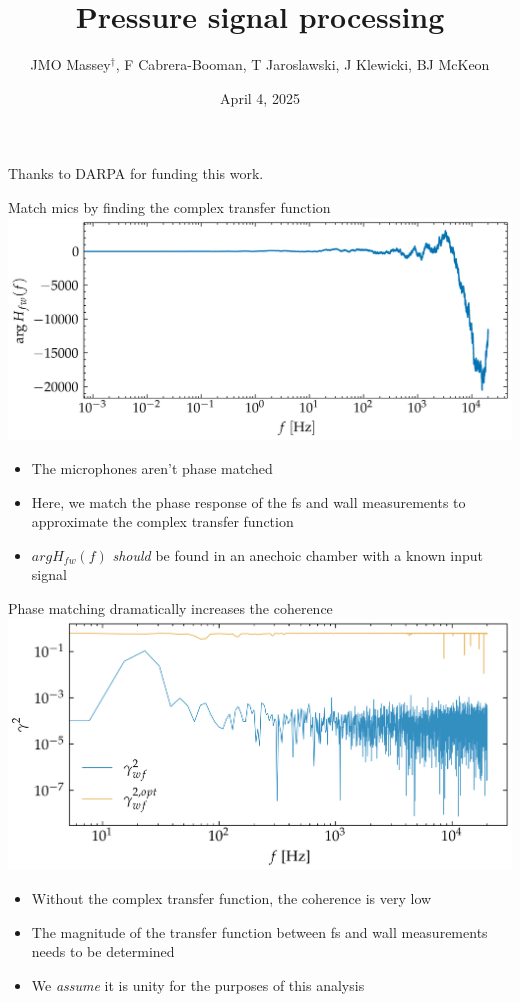 \documentclass[aspectratio=169]{beamer}
\title{Pressure signal processing}
\author{JMO Massey$^{\dag}$, F Cabrera-Booman, T Jaroslawski, J Klewicki, BJ McKeon}
\institute{Center for Turbulence Research \\ Stanford University}
\date{April 4, 2025}
\begin{document}
\begin{frame}
    \setcounter{framenumber}{0}
    \titlepage
    \vfill
    {\scriptsize \centering Thanks to DARPA for funding this work.\par}
\end{frame}

\begin{frame}{Match mics by finding the complex transfer function}
    \centering
    \includegraphics[width=0.7\linewidth]{figures/complex_transfer_function.png}
    \begin{itemize}
            \centering
        \item The microphones aren't phase matched
        \item Here, we match the phase response of the fs and wall measurements to approximate the complex transfer function
        \item $argH_{fw}(f)$ \emph{should} be found in an anechoic chamber with a known input signal
    \end{itemize}
\end{frame}

\begin{frame}{Phase matching dramatically increases the coherence}
    \centering
    \includegraphics[width=0.7\linewidth]{figures/coherence.png}
    \begin{itemize}
        \centering
        \item Without the complex transfer function, the coherence is very low
        \item The magnitude of the transfer function between fs and wall measurements needs to be determined
        \item We \emph{assume} it is unity for the purposes of this analysis
    \end{itemize}
\end{frame}
\end{document}
